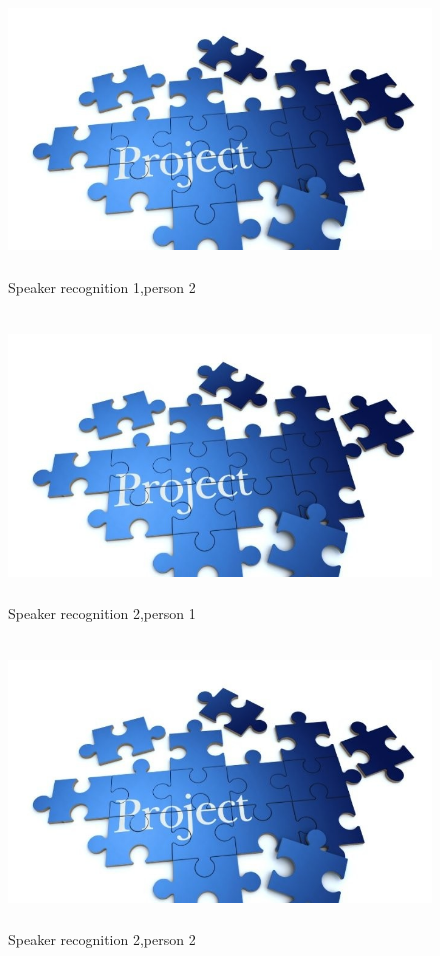 \documentclass[12pt,a4paper]{report}
\begin{document}
\begin{figure} [hbtp]
\centering
\includegraphics[width=5in,height=3in]{./pic/sample.jpg}
\caption{Speaker recognition 1,person 2}
\end{figure}

\begin{figure} [hbtp]
\centering
\includegraphics[width=5in,height=3in]{./pic/sample.jpg}
\caption{Speaker recognition 2,person 1}
\end{figure}

\begin{figure} [hbtp]
\centering
\includegraphics[width=5in,height=3in]{./pic/sample.jpg}
\caption{Speaker recognition 2,person 2}
\end{figure}
\end{document}
